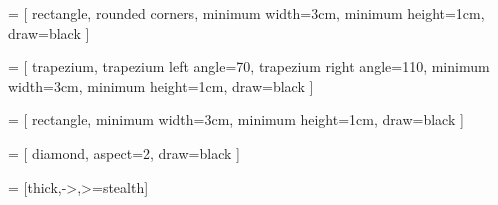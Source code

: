 \usepackage{tikz}
\usetikzlibrary{shapes.geometric, arrows}

 = [
    rectangle,
    rounded corners,
    minimum width=3cm,
    minimum height=1cm,
    draw=black
]

 = [
    trapezium,
    trapezium left angle=70,
    trapezium right angle=110,
    minimum width=3cm,
    minimum height=1cm,
    draw=black
]

 = [
    rectangle,
    minimum width=3cm,
    minimum height=1cm,
    draw=black
]

 = [
    diamond,
    aspect=2,
    draw=black
]

 = [thick,->,>=stealth]

\newcommand{\flowone}{
\begin{center}
\begin{tikzpicture}[node distance=2cm]
\node (start) [startstop] {Start};
\node (input) [inputoutput, below of=start] 
{Read marks m1, m2, m3};
\node (process1) [process, below of=input] 
{sum = m1 + m2 + m3};
\node (process2) [process, below of=process1] 
{avg = sum / 3};
\node (output) [inputoutput, below of=process2] 
{Display Average};
\node (stop) [startstop, below of=output] {Stop};

\draw [arrow] (start) -- (input);
\draw [arrow] (input) -- (process1);
\draw [arrow] (process1) -- (process2);
\draw [arrow] (process2) -- (output);
\draw [arrow] (output) -- (stop);

\end{tikzpicture}
\end{center}
}

\newcommand{\flowtwo}{
\begin{center}
\begin{tikzpicture}[node distance=2cm]

\node (start) [startstop] {Start};

\node (input) [inputoutput, below of=start]
{Enter weight in kg};

\node (process1) [process, below of=input]
{Create Weight object};

\node (process2) [process, below of=process1]
{pound = kg $\times$ 2.20462};

\node (output) [inputoutput, below of=process2]
{Display pound value};

\node (stop) [startstop, below of=output]
{Stop};

\draw [arrow] (start) -- (input);
\draw [arrow] (input) -- (process1);
\draw [arrow] (process1) -- (process2);
\draw [arrow] (process2) -- (output);
\draw [arrow] (output) -- (stop);

\end{tikzpicture}
\end{center}
}


